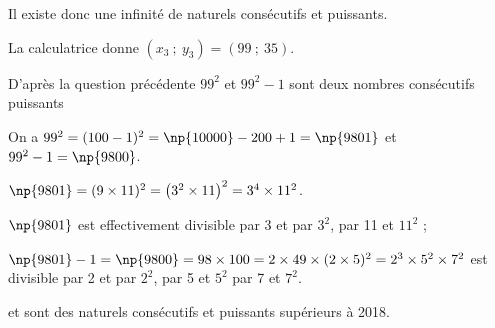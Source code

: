 \documentclass[10pt]{article}
\begin{document}
\begin{enumerate}[resume]
Il existe donc une infinité de naturels consécutifs et puissants.

La calculatrice donne $\left(x_3~;~y_3\right) = (99~;~35)$.

D'après la question précédente $99^2$ et $99^2 - 1$ sont deux nombres consécutifs puissants

On a  $99^2 = (100 - 1)^2 = \np{10000} - 200 + 1 = \np{9801}$ et $99^2 - 1 = \np{9800}$.

$\np{9801} = (9 \times 11)^2 = \left(3^2 \times 11\right)^2 = 3^4 \times 11^2$.

$\np{9801}$ est effectivement  divisible par 3 et par $3^2$, par 11 et $11^2$ ;

$\np{9801} - 1 = \np{9800} = 98 \times 100 = 2 \times 49 \times (2 \times 5)^2 = 2^3 \times 5^2 \times 7^2$ est divisible par 2 et par $2^2$, par 5 et $5^2$ par 7 et $7^2$.

 et  sont des naturels consécutifs et puissants supérieurs à 2018.
\end{enumerate}
\end{document}

